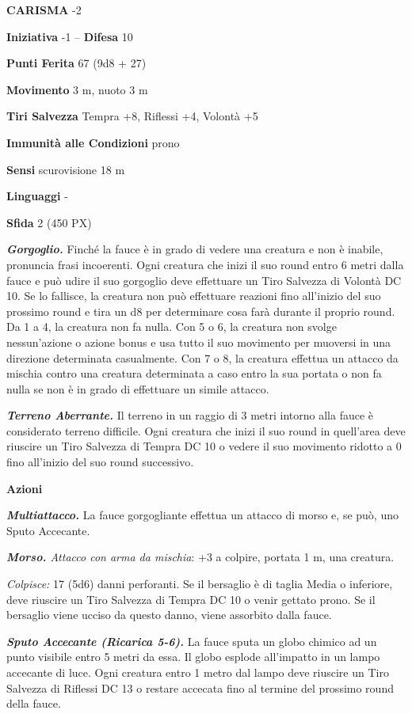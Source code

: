 \begin{multicols}{2}
	\textbf{CARISMA} -2

	\textbf{Iniziativa} -1 -- \textbf{Difesa} 10

	\textbf{Punti Ferita} 67 (9d8 + 27)

	\textbf{Movimento} 3 m, nuoto 3 m

	\textbf{Tiri Salvezza} Tempra +8, Riflessi +4, Volontà +5

	\textbf{Immunità alle Condizioni} prono

	\textbf{Sensi} scurovisione 18 m

	\textbf{Linguaggi} -

	\textbf{Sfida} 2 (450 PX)

	\textit{\textbf{Gorgoglio.}} Finché la fauce è in grado di vedere una creatura e non è inabile, pronuncia frasi incoerenti. Ogni creatura che inizi il suo round entro 6 metri dalla fauce e può udire il suo gorgoglio deve effettuare un Tiro Salvezza di Volontà DC 10. Se lo fallisce, la creatura non può effettuare reazioni fino all'inizio del suo prossimo round e tira un d8 per determinare cosa farà durante il proprio round. Da 1 a 4, la creatura non fa nulla. Con 5 o 6, la creatura non svolge nessun'azione o azione bonus e usa tutto il suo movimento per muoversi in una direzione determinata casualmente. Con 7 o 8, la creatura effettua un attacco da mischia contro una creatura determinata a caso entro la sua portata o non fa nulla se non è in grado di effettuare un simile attacco.

	\textit{\textbf{Terreno Aberrante.}} Il terreno in un raggio di 3 metri intorno alla fauce è considerato terreno difficile. Ogni creatura che inizi il suo round in quell'area deve riuscire un Tiro Salvezza di Tempra DC 10 o vedere il suo movimento ridotto a 0 fino all'inizio del suo round successivo.

	\textbf{Azioni}

	\textit{\textbf{Multiattacco.}} La fauce gorgogliante effettua un attacco di morso e, se può, uno Sputo Accecante.

	\textit{\textbf{Morso.} Attacco con arma da mischia}: +3 a colpire, portata 1 m, una creatura.

	\textit{Colpisce:} 17 (5d6) danni perforanti. Se il bersaglio è di taglia Media o inferiore, deve riuscire un Tiro Salvezza di Tempra DC 10 o venir gettato prono. Se il bersaglio viene ucciso da questo danno, viene assorbito dalla fauce.

	\textit{\textbf{Sputo Accecante (Ricarica 5-6).}} La fauce sputa un globo chimico ad un punto visibile entro 5 metri da essa. Il globo esplode all'impatto in un lampo accecante di luce. Ogni creatura entro 1 metro dal lampo deve riuscire un Tiro Salvezza di Riflessi DC 13 o restare accecata fino al termine del prossimo round della fauce.


\end{multicols}

